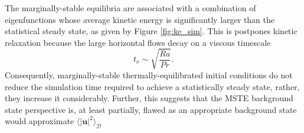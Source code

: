 \documentclass[reprint,amsmath,amssymb,aps]{revtex4-1}
\begin{document}
The marginally-stable equilibria are associated with a combination of eigenfunctions whose average kinetic energy is significantly larger than the statistical steady state, as given by Figure \ref{fig:ke_sim}. 
This is postpones kinetic relaxation because the large horizontal flows decay on a viscous timescale
\begin{equation}
    t_{\nu} \sim \sqrt{\frac{Ra}{Pr}}. \nonumber
\end{equation}
Consequently, marginally-stable thermally-equilibrated initial conditions do not reduce the simulation time required to achieve a statistically steady state, rather, they increase it considerably. Further, this suggests that the MSTE background state perspective is, at least partially, flawed as an appropriate background state would approximate $\langle|\mathbf{u}|^2 \rangle_{\mathcal{D}}$
\end{document}
